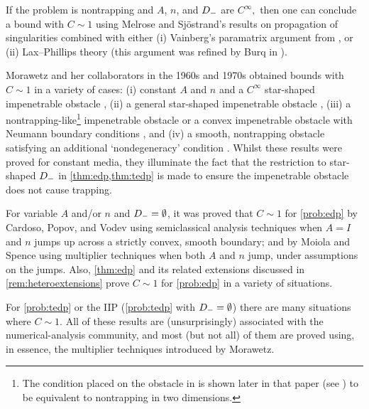 If the problem is nontrapping and $A$, $n$, and $D_{-}$ are $C^\infty,$ then one can conclude a bound with $C \sim 1$ using Melrose and Sj\"ostrand's results on propagation of singularities \cite{MeSj:82} combined with either (i) Vainberg's paramatrix argument from \cite{Va:75}, or (ii) Lax--Phillips theory \cite{LaPh:89} (this argument was refined by Burq in \cite{Bu:02}).

Morawetz and her collaborators in the 1960s and 1970s obtained bounds with $C \sim 1$ in a variety of cases: (i) constant $A$ and $n$ and a $C^\infty$ star-shaped impenetrable obstacle \cite{Mo:61}, (ii) a general star-shaped impenetrable obstacle \cite{MoLu:68}, (iii) a nontrapping-like\footnote{The condition placed on the obstacle in \cite[Equation (1.3)]{Mo:75} is shown later in that paper (see \cite[Equation (1.3a)]{Mo:75}) to be equivalent to nontrapping in two dimensions.} impenetrable obstacle or a convex impenetrable obstacle with Neumann boundary conditions \cite{Mo:75}, and (iv) a smooth, nontrapping obstacle satisfying an additional `nondegeneracy' condition \cite{MoRaSt:77}. Whilst these results were proved for constant media, they illuminate the fact that the restriction to star-shaped $D_{-}$ in \cref{thm:edp,thm:tedp} is made to ensure the impenetrable obstacle does not cause trapping.

For variable $A$ and/or $n$ and $D_{-} = \emptyset$, it was proved that $C \sim 1$ for \cref{prob:edp} by Cardoso, Popov, and Vodev \cite{CaPoVo:99,PoVo:99b} using semiclassical analysis techniques when $A=I$ and $n$ jumps up across a strictly convex, smooth boundary; and by Moiola and Spence \cite{MoSp:19} using multiplier techniques when both $A$ and $n$ jump, under assumptions on the jumps. Also, \cref{thm:edp} and its related extensions discussed in \cref{rem:heteroextensions} prove $C \sim 1$ for \cref{prob:edp} in a variety of situations.

For \cref{prob:tedp} or the IIP (\cref{prob:tedp} with $D_{-}=\emptyset$) there are many situations where $C \sim 1.$  All of these results are (unsurprisingly) associated with the numerical-analysis community, and most (but not all) of them are proved using, in essence, the multiplier techniques introduced by Morawetz.

